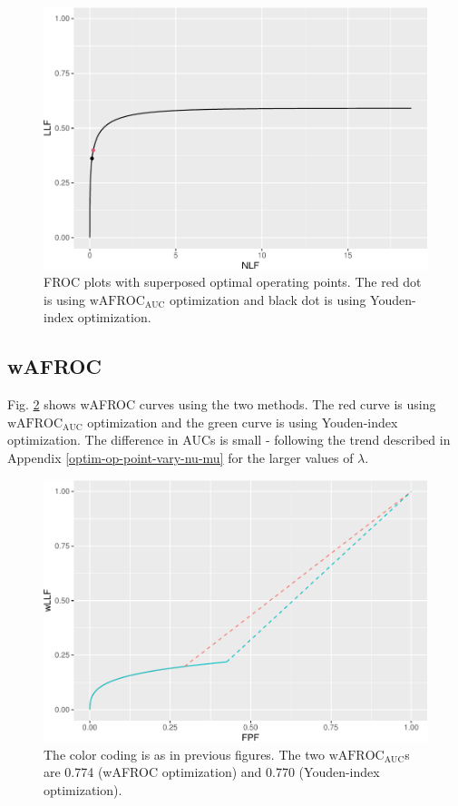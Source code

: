 \documentclass[
]{book}
\begin{document}
\begin{figure}
\centering
\includegraphics{21-optim-op-point_files/figure-latex/optim-op-point-application-froc-1.pdf}
\caption{\label{fig:optim-op-point-application-froc}FROC plots with superposed optimal operating points. The red dot is using \(\text{wAFROC}_\text{AUC}\) optimization and black dot is using Youden-index optimization.}
\end{figure}

\hypertarget{wafroc-2}{%
\subsection{wAFROC}\label{wafroc-2}}

Fig. \ref{fig:optim-op-point-application-wafroc} shows wAFROC curves using the two methods. The red curve is using \(\text{wAFROC}_\text{AUC}\) optimization and the green curve is using Youden-index optimization. The difference in AUCs is small - following the trend described in Appendix \ref{optim-op-point-vary-nu-mu} for the larger values of \(\lambda\).

\begin{figure}
\centering
\includegraphics{21-optim-op-point_files/figure-latex/optim-op-point-application-wafroc-1.pdf}
\caption{\label{fig:optim-op-point-application-wafroc}The color coding is as in previous figures. The two \(\text{wAFROC}_\text{AUC}\)s are 0.774 (wAFROC optimization) and 0.770 (Youden-index optimization).}
\end{figure}
\end{document}
